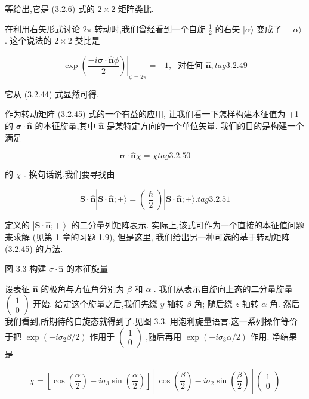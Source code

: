 等给出,它是 (3.2.6) 式的 $2 \times 2$ 矩阵类比.

在利用右矢形式讨论 ${2\pi }$ 转动时,我们曾经看到一个自旋 $\frac{1}{2}$ 的右矢 $|\alpha \rangle$ 变成了 $- |\alpha \rangle$ . 这个说法的 $2 \times 2$ 类比是

$$
{\left. \exp \left( \frac{-i\mathbf{\sigma } \cdot \widehat{\mathbf{n}}\phi }{2}\right) \right| }_{\phi = {2\pi }} = - 1,\;\text{ 对任何 }\widehat{\mathbf{n}}, tag{3.2.49}
$$

它从 (3.2.44) 式显然可得.

作为转动矩阵 (3.2.45) 式的一个有益的应用, 让我们看一下怎样构建本征值为 +1 的 $\mathbf{\sigma } \cdot \widehat{\mathbf{n}}$ 的本征旋量,其中 $\widehat{\mathbf{n}}$ 是某特定方向的一个单位矢量. 我们的目的是构建一个满足

$$
\mathbf{\sigma } \cdot \widehat{\mathbf{n}}\chi = \chi tag{3. 2.50}
$$

的 $\chi$ . 换句话说,我们要寻找由

$$
\mathbf{S} \cdot \widehat{\mathbf{n}}\left| {\mathbf{S} \cdot \widehat{\mathbf{n}}; + \rangle = \left( \frac{\hslash }{2}\right) }\right| \mathbf{S} \cdot \widehat{\mathbf{n}}; + \rangle . tag{3. 2.51}
$$

定义的 $\left| {\mathbf{S} \cdot \widehat{\mathbf{n}}; + }\right\rangle$ 的二分量列矩阵表示. 实际上,该式可作为一个直接的本征值问题来求解 (见第 1 章的习题 1.9), 但是这里, 我们给出另一种可选的基于转动矩阵 (3.2.45) 的方法.


图 3.3 构建 $\sigma \cdot \widehat{\mathrm{n}}$ 的本征旋量

设表征 $\widehat{\mathbf{n}}$ 的极角与方位角分别为 $\beta$ 和 $\alpha$ . 我们从表示自旋向上态的二分量旋量 $\left( \begin{array}{l} 1 \\ 0 \end{array}\right)$ 开始. 给定这个旋量之后,我们先绕 $y$ 轴转 $\beta$ 角; 随后绕 $z$ 轴转 $\alpha$ 角. 然后我们看到,所期待的自旋态就得到了,见图 3.3. 用泡利旋量语言,这一系列操作等价于把 $\exp \left( {-i{\sigma }_{2}\beta /2}\right)$ 作用于 $\left( \begin{array}{l} 1 \\ 0 \end{array}\right)$ ,随后再用 $\exp \left( {-i{\sigma }_{3}\alpha /2}\right)$ 作用. 净结果是

$$
\chi = \left\lbrack {\cos \left( \frac{\alpha }{2}\right) - i{\sigma }_{3}\sin \left( \frac{\alpha }{2}\right) }\right\rbrack \left\lbrack {\cos \left( \frac{\beta }{2}\right) - i{\sigma }_{2}\sin \left( \frac{\beta }{2}\right) }\right\rbrack \left( \begin{array}{l} 1 \\ 0 \end{array}\right)
$$


